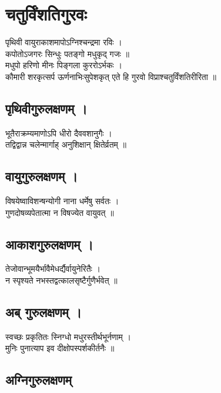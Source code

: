 \section{चतुर्विंशतिगुरवः}

पृथिवी वायुराकाशमापोऽग्निश्चन्द्रमा रविः ।\\[-2mm]
कपोतोऽजगरः सिन्धुः पतङ्गो मधुकृद् गजः ॥\\
मधुपो हरिणो मीनः पिङ्गला कुररोऽर्भकः ।\\[-2mm]
कौमारी शरकृत्सर्प ऊर्णनाभिःसुपेशकृत्
एते हि गुरवो विप्राश्चतुर्विंशतिरीरिता ॥\\

\subsection{पृथिवीगुरुलक्षणम् ।}

भूतैराक्रम्यमाणोऽपि धीरो दैववशानुगैः ।\\[-2mm]
तद्विद्वान्न चलेन्मार्गाह् अनुशिक्षान् क्षितेर्व्रतम् ॥\\

\subsection{वायुगुरुलक्षणम् ।}

विषयेष्वाविशन्षन्योगी नाना धर्मेषु सर्वतः ।\\[-2mm]
गुणदोषव्यपेतात्मा न विषज्येत वायुवत् ॥\\

\subsection{आकाशगुरुलक्षणम् ।}

तेजोवान्भूमयैर्भावैमेधर्द्यैर्वायुनेरितैः ।\\[-2mm]
न स्पृश्यते नभस्तद्वत्कालसृष्टैर्गुणैर्भवेत् ॥\\

\subsection{अब् गुरुलक्षणम् ।}

स्वच्छः प्रकृतितः स्निग्धो मधुरस्तीर्थभूर्नणाम् ।\\[-2mm]
मुनिः पुनात्याप इव दीक्षोपस्पर्शकीर्तनैः ॥\\

\subsection{अग्निगुरुलक्षणम्}

